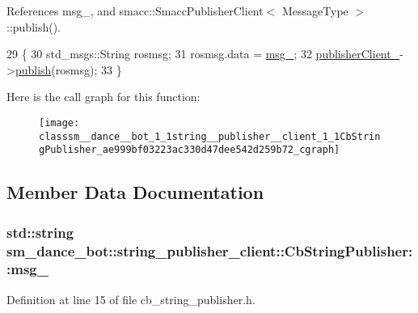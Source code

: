 References msg\+\_\+, and smacc\+::\+Smacc\+Publisher\+Client$<$ Message\+Type $>$\+::publish().


\begin{DoxyCode}
29     \{
30         std\_msgs::String rosmsg;
31         rosmsg.data = \hyperlink{classsm__dance__bot_1_1string__publisher__client_1_1CbStringPublisher_a838e820800dd07fdf1179735fe727b12}{msg\_};
32         \hyperlink{classsm__dance__bot_1_1string__publisher__client_1_1CbStringPublisher_ab193cff488df923ffc0fcc1939c487f5}{publisherClient\_}->\hyperlink{classsmacc_1_1SmaccPublisherClient_aa635210d9104a5b6f3ea15cb2bf16518}{publish}(rosmsg);
33     \}
\end{DoxyCode}


Here is the call graph for this function\+:
\nopagebreak
\begin{figure}[H]
\begin{center}
\leavevmode
\texttt{[image: classsm\_\_dance\_\_bot\_1\_1string\_\_publisher\_\_client\_1\_1CbStringPublisher\_ae999bf03223ac330d47dee542d259b72\_cgraph]}
\end{center}
\end{figure}




\subsection{Member Data Documentation}
\subsubsection[{\texorpdfstring{msg\+\_\+}{msg_}}]{\setlength{\rightskip}{0pt plus 5cm}std\+::string sm\+\_\+dance\+\_\+bot\+::string\+\_\+publisher\+\_\+client\+::\+Cb\+String\+Publisher\+::msg\+\_\+}\hypertarget{classsm__dance__bot_1_1string__publisher__client_1_1CbStringPublisher_a838e820800dd07fdf1179735fe727b12}{}\label{classsm__dance__bot_1_1string__publisher__client_1_1CbStringPublisher_a838e820800dd07fdf1179735fe727b12}


Definition at line 15 of file cb\+\_\+string\+\_\+publisher.\+h.



